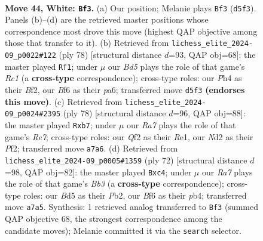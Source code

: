 \documentclass[11pt]{article}
\begin{document}
\clearpage

\begin{figure}[p]\centering
\begin{subfigure}{0.46\textwidth}\centering
\resizebox{\linewidth}{!}{%
\newchessgame
\chessboard[
  setfen={1r3r2/Rbq2p1k/1p3Bp1/3B4/7P/1P6/2PN1Q2/R5K1 w - - 1 44},
  showmover=false,
  pgfstyle=straightmove, color=movearrow, markmove={d5-f3}
]}
\caption{}
\end{subfigure}\hfill
\begin{subfigure}{0.46\textwidth}\centering
\resizebox{\linewidth}{!}{%
\newchessgame
\chessboard[
  setfen={3r1r1k/3q2pp/p1p5/1p6/5b2/2Q2R1P/1P3BP1/2R4K w - - 0 40},
  showmover=false,
  pgfstyle=straightmove, color=movearrow, markmove={c1-f1}
]}
\caption{}
\end{subfigure}
\\[4pt]
\begin{subfigure}{0.46\textwidth}\centering
\resizebox{\linewidth}{!}{%
\newchessgame
\chessboard[
  setfen={2r1B1k1/1p2Rbq1/5rp1/5p1p/8/Q6P/5PP1/4R1K1 w - - 8 40},
  showmover=false,
  pgfstyle=straightmove, color=movearrow, markmove={e7-b7}
]}
\caption{}
\end{subfigure}\hfill
\begin{subfigure}{0.46\textwidth}\centering
\resizebox{\linewidth}{!}{%
\newchessgame
\chessboard[
  setfen={1q2r2k/6p1/4r2p/1p6/1pnR1P2/1B5P/PP4QK/3R4 w - - 1 37},
  showmover=false,
  pgfstyle=straightmove, color=movearrow, markmove={b3-c4}
]}
\caption{}
\end{subfigure}
\caption{\textbf{Move 44, White: \texttt{Bf3}.} (a) Our position; Melanie plays \texttt{Bf3} (\texttt{d5f3}). Panels (b)--(d) are the retrieved master positions whose correspondence most drove this move (highest QAP objective among those that transfer to it). (b) Retrieved from \texttt{lichess\_elite\_2024-09\_p0022\#122} (ply 78) [structural distance $d$=93, QAP obj=68]: the master played \texttt{Rf1}; under $\mu$ our \emph{Bd5} plays the role of that game's \emph{Rc1} (a \textbf{cross-type} correspondence); cross-type roles: our \emph{P}h4 as their \emph{B}f2, our \emph{B}f6 as their \emph{p}a6; transferred move \texttt{d5f3} \textbf{(endorses this move)}. (c) Retrieved from \texttt{lichess\_elite\_2024-09\_p0024\#2395} (ply 78) [structural distance $d$=96, QAP obj=88]: the master played \texttt{Rxb7}; under $\mu$ our \emph{Ra7} plays the role of that game's \emph{Re7}; cross-type roles: our \emph{Q}f2 as their \emph{R}e1, our \emph{N}d2 as their \emph{P}f2; transferred move \texttt{a7a6}. (d) Retrieved from \texttt{lichess\_elite\_2024-09\_p0005\#1359} (ply 72) [structural distance $d$=98, QAP obj=82]: the master played \texttt{Bxc4}; under $\mu$ our \emph{Ra7} plays the role of that game's \emph{Bb3} (a \textbf{cross-type} correspondence); cross-type roles: our \emph{B}d5 as their \emph{P}b2, our \emph{B}f6 as their \emph{p}b4; transferred move \texttt{a7a5}. Synthesis: 1 retrieved analog transferred to \texttt{Bf3} (summed QAP objective 68, the strongest correspondence among the candidate moves); Melanie committed it via the \texttt{search} selector.}
\label{fig:thought-m86}
\end{figure}
\end{document}
